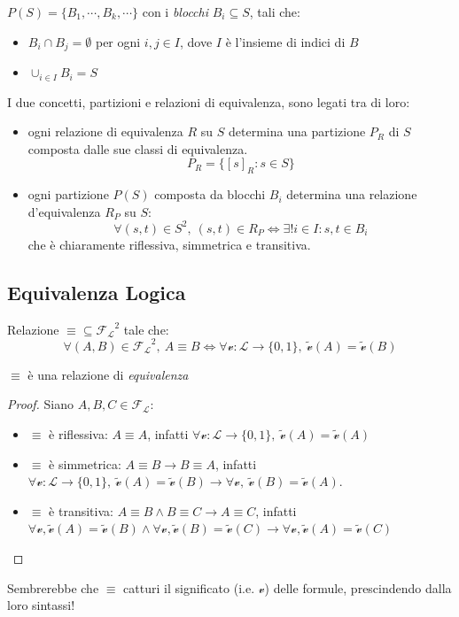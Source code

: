 \begin{defi}[Partizione] 
  $P(S) = \{B_1, \cdots, B_k, \cdots\}$ con i \textit{blocchi} $B_i \subseteq S$, tali che:
  \begin{itemize}
    \item $B_i \cap B_j = \emptyset$ per ogni $i,j \in I$, dove $I$ è l'insieme di indici di $B$
    \item $\cup_{i \in I} B_i = S$
  \end{itemize}
\end{defi}
\noindent
I due concetti, partizioni e relazioni di equivalenza, sono legati tra di loro:
\begin{itemize}
  \item ogni relazione di equivalenza $R$ su $S$ determina una partizione $P_R$ di $S$ composta dalle sue classi di equivalenza.
    $$
      P_R = \{[s]_R : s \in S\}
    $$
  \item ogni partizione $P(S)$ composta da blocchi $B_i$ determina una relazione d'equivalenza $R_P$ su $S$: 
    $$
      \forall (s,t) \in S^2,\ (s,t) \in R_P \iff \exists! i \in I : s,t \in B_i
    $$
che è chiaramente riflessiva, simmetrica e transitiva. 
\end{itemize}

\subsection{Equivalenza Logica}
\begin{defi}
\label{def:equivalenza}
  Relazione $\equiv \subseteq \mathscr{F_L}^2$ tale che:
  $$
    \forall (A,B) \in \mathscr{F_L}^2,\ A \equiv B \iff \forall \mathcal{v}:\mathscr{L}\rightarrow \{0,1\},\ \widetilde{\mathcal{v}}(A) = \widetilde{\mathcal{v}}(B)
  $$
\end{defi}
\begin{oss}
  $\equiv$ è una relazione di \textit{equivalenza}
\end{oss}
\begin{proof}
Siano $A, B, C \in \mathscr{F_L}$:
  \begin{itemize}
    \item $\equiv$ è riflessiva: $A \equiv A$, infatti $\forall \mathcal{v} : \mathscr{L} \rightarrow \{0,1\},\ \widetilde{\mathcal{v}}(A) = \widetilde{\mathcal{v}}(A)$
    \item $\equiv$ è simmetrica: $A \equiv B \rightarrow B \equiv A$, infatti $\forall \mathcal{v}:\mathscr{L} \rightarrow \{0,1\},\ \widetilde{\mathcal{v}}(A) = \widetilde{\mathcal{v}}(B) \rightarrow \forall \mathcal{v},\  \widetilde{\mathcal{v}}(B) = \widetilde{\mathcal{v}}(A)$. 
    \item $\equiv$ è transitiva: $A \equiv B \land B \equiv C \rightarrow A \equiv C$, infatti $\forall \mathcal{v}, \widetilde{\mathcal{v}}(A) = \widetilde{\mathcal{v}}(B) \land \forall \mathcal{v}, \widetilde{\mathcal{v}}(B) = \widetilde{\mathcal{v}}(C) \rightarrow \forall \mathcal{v}, \widetilde{\mathcal{v}}(A) = \widetilde{\mathcal{v}}(C)$ 
  \end{itemize}
\end{proof} 
\noindent
Sembrerebbe che $\equiv$ catturi il significato (i.e. $\mathcal{v}$) delle formule, prescindendo dalla loro sintassi!


